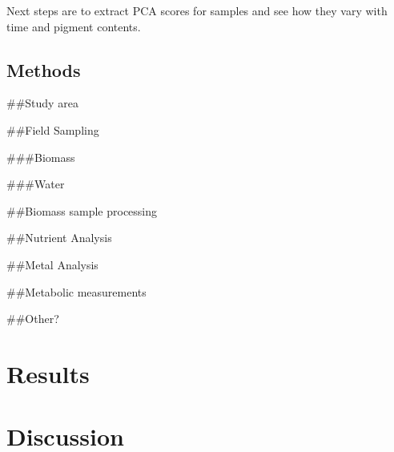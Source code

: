 \documentclass[
]{article}
\begin{document}
\FloatBarrier

\newpage

Next steps are to extract PCA scores for samples and see how they vary
with time and pigment contents.

\hypertarget{methods}{%
\subsection{Methods}\label{methods}}

\#\#Study area

\#\#Field Sampling

\#\#\#Biomass

\#\#\#Water

\#\#Biomass sample processing

\#\#Nutrient Analysis

\#\#Metal Analysis

\#\#Metabolic measurements

\#\#Other?

\hypertarget{results}{%
\section{Results}\label{results}}

\hypertarget{discussion}{%
\section{Discussion}\label{discussion}}
\end{document}
